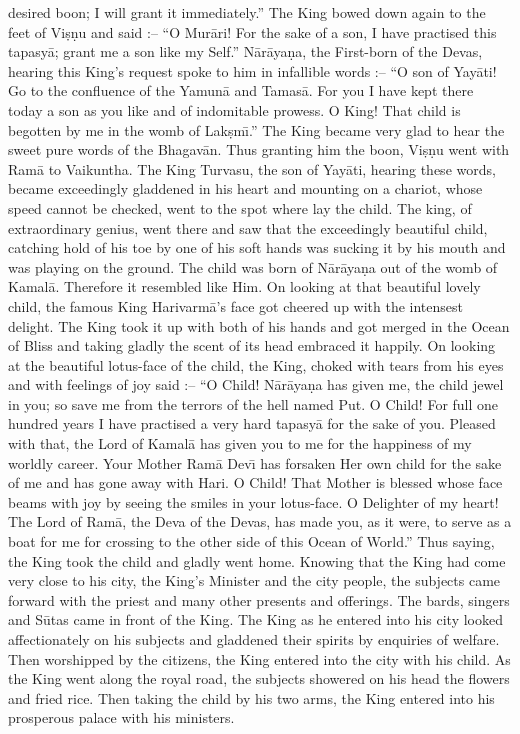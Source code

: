 desired boon; I will grant it immediately.'' The King bowed down again to the feet of Vi\d{s}\d{n}u and said :-- ``O Mur\=ari! For the sake of a son, I have practised this tapasy\=a; grant me a son like my Self.'' N\=ar\=aya\d{n}a, the First-born of the Devas, hearing this King's request spoke to him in infallible words :-- ``O son of Yay\=ati! Go to the confluence of the Yamun\=a and Tamas\=a. For you I have kept there today a son as you like and of indomitable prowess. O King! That child is begotten by me in the womb of Lak\d{s}m\={\i}.'' The King became very glad to hear the sweet pure words of the Bhagav\=an. Thus granting him the boon, Vi\d{s}\d{n}u went with Ram\=a to Vaikuntha. The King Turvasu, the son of Yay\=ati, hearing these words, became exceedingly gladdened in his heart and mounting on a chariot, whose speed cannot be checked, went to the spot where lay the child. The king, of extraordinary genius, went there and saw that the exceedingly beautiful child, catching hold of his toe by one of his soft hands was sucking it by his mouth and was playing on the ground. The child was born of N\=ar\=aya\d{n}a out of the womb of Kamal\=a. Therefore it resembled like Him. On looking at that beautiful lovely child, the famous King Harivarm\=a's face got cheered up with the intensest delight. The King took it up with both of his hands and got merged in the Ocean of Bliss and taking gladly the scent of its head embraced it happily. On looking at the beautiful lotus-face of the child, the King, choked with tears from his eyes and with feelings of joy said :-- ``O Child! N\=ar\=aya\d{n}a has given me, the child jewel in you; so save me from the terrors of the hell named Put. O Child! For full one hundred years I have practised a very hard tapasy\=a for the sake of you. Pleased with that, the Lord of Kamal\=a has given you to me for the happiness of my worldly career. Your Mother Ram\=a Dev\={\i} has forsaken Her own child for the sake of me and has gone away with Hari. O Child! That Mother is blessed whose face beams with joy by seeing the smiles in your lotus-face. O Delighter of my heart! The Lord of Ram\=a, the Deva of the Devas, has made you, as it were, to serve as a boat for me for crossing to the other side of this Ocean of World.'' Thus saying, the King took the child and gladly went home. Knowing that the King had come very close to his city, the King's Minister and the city people, the subjects came forward with the priest and many other presents and offerings. The bards, singers and S\=utas came in front of the King. The King as he entered into his city looked affectionately on his subjects and gladdened their spirits by enquiries of welfare. Then worshipped by the citizens, the King entered into the city with his child. As the King went along the royal road, the subjects showered on his head the flowers and fried rice. Then taking the child by his two arms, the King entered into his prosperous palace with his ministers.

